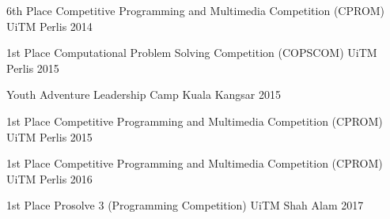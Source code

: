 
\begin{cvhonors}

  \cvhonor
    {6th Place}
    {Competitive Programming and Multimedia Competition (CPROM)}
    {UiTM Perlis}
    {2014}

  \cvhonor
    {1st Place}
    {Computational Problem Solving Competition (COPSCOM)}
    {UiTM Perlis}
    {2015}

  \cvhonor
    {}
    {Youth Adventure Leadership Camp}
    {Kuala Kangsar}
    {2015}

  \cvhonor
    {1st Place}
    {Competitive Programming and Multimedia Competition (CPROM)}
    {UiTM Perlis}
    {2015}
        
  \cvhonor
    {1st Place}
    {Competitive Programming and Multimedia Competition (CPROM)}
    {UiTM Perlis}
    {2016}

  \cvhonor
    {1st Place}
    {Prosolve 3 (Programming Competition)}
    {UiTM Shah Alam}
    {2017}

\end{cvhonors}
